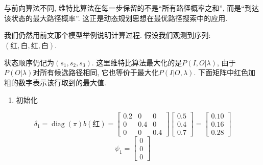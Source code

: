 与前向算法不同, 维特比算法在每一步保留的不是“所有路径概率之和”, 而是“到达该状态的最大路径概率”.
这正是动态规划思想在最优路径搜索中的应用.

我们仍然用前文那个模型举例说明计算过程.
假设我们观测到序列: $(\text{红}, \text{白}, \text{红}, \text{白})$.

\providecommand{\viterbimax}[1]{\textcolor{red!70!black}{\mathbf{#1}}}

状态顺序仍记为$(s_1, s_2, s_3)$.
这里维特比算法最大化的是$P(I, O | \lambda)$, 由于$P(O | \lambda)$对所有候选路径相同, 它也等价于最大化$P(I | O, \lambda)$.
下面矩阵中红色加粗的数字表示该行取到的最大值.

\begin{enumerate}
\item[1.] 初始化
\end{enumerate}
\[
\delta_1 = \operatorname{diag}(\pi) b(\text{红})
    =
    \begin{bmatrix}0.2 & 0 & 0 \\ 0 & 0.4 & 0 \\ 0 & 0 & 0.4\end{bmatrix}
    \begin{bmatrix}0.5 \\ 0.4 \\ 0.7\end{bmatrix}
    = \begin{bmatrix}0.10 \\ 0.16 \\ 0.28\end{bmatrix}
\]
\[
\psi_1 = \begin{bmatrix}0 \\ 0 \\ 0\end{bmatrix}
\]

